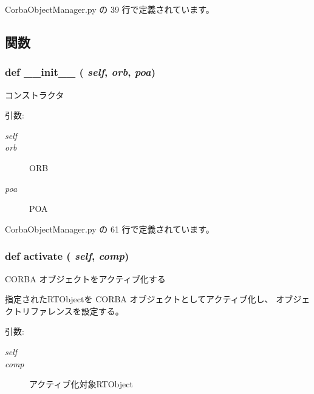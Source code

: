  CorbaObjectManager.py の 39 行で定義されています。

\subsection{関数}
\subsubsection{\setlength{\rightskip}{0pt plus 5cm}def \_\-\_\-init\_\-\_\- ( {\em self},  {\em orb},  {\em poa})}\label{classsource__py_1_1_corba_object_manager_1_1_corba_object_manager_c775ee34451fdfa742b318538164070e}


コンストラクタ 

\begin{Desc}
\item[引数:]
\begin{description}
\item[{\em self}]\item[{\em orb}]ORB \item[{\em poa}]POA \end{description}
\end{Desc}


 CorbaObjectManager.py の 61 行で定義されています。
\subsubsection{\setlength{\rightskip}{0pt plus 5cm}def activate ( {\em self},  {\em comp})}\label{classsource__py_1_1_corba_object_manager_1_1_corba_object_manager_e2a8be8d3c1486427d2685f3966c81e2}


CORBA オブジェクトをアクティブ化する 

指定されたRTObjectを CORBA オブジェクトとしてアクティブ化し、 オブジェクトリファレンスを設定する。

\begin{Desc}
\item[引数:]
\begin{description}
\item[{\em self}]\item[{\em comp}]アクティブ化対象RTObject \end{description}
\end{Desc}


